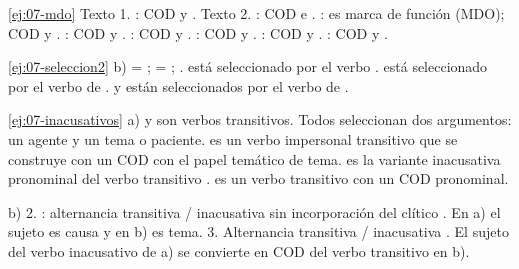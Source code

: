 \begin{solucion}{\ref{ej:07-mdo}}
Texto 1. : COD  y
. Texto 2. : COD  e
. :  es marca de función (MDO); COD
 y . : COD
 y . : COD  y . :
COD  y . : COD 
y . : COD  y
.
\end{solucion}

\begin{solucion}{\ref{ej:07-seleccion2}}
b)  = ;  = ;
.  está seleccionado por el
verbo .  está seleccionado por el verbo de
 .  y  están seleccionados por el verbo de  .
\end{solucion}

\begin{solucion}{\ref{ej:07-inacusativos}}
a)  y  son verbos
transitivos. Todos seleccionan dos argumentos: un agente y un tema o paciente.
 es un verbo impersonal transitivo que se construye con un COD con
el papel temático de tema.  es la variante inacusativa
pronominal del verbo transitivo .  es un verbo
transitivo con un COD pronominal.

b) 2. : alternancia transitiva / inacusativa sin incorporación
del clítico . En a) el sujeto es causa y en b) es tema. 3. Alternancia
transitiva / inacusativa . El sujeto del verbo
inacusativo de a) se convierte en COD del verbo transitivo en b).
\end{solucion}
